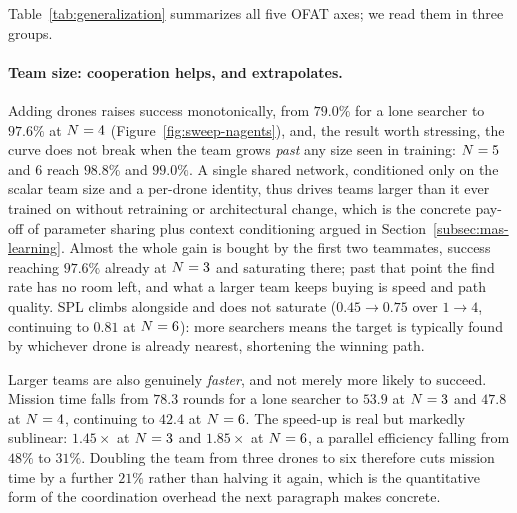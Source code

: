 Table~\ref{tab:generalization} summarizes all five OFAT axes; we read them in
three groups.

\paragraph{Team size: cooperation helps, and extrapolates.}
Adding drones raises success monotonically, from $79.0\%$ for a lone searcher to
$97.6\%$ at $N = 4$ (Figure~\ref{fig:sweep-nagents}), and, the result
worth stressing, the curve does not break when the team grows \emph{past} any
size seen in training: $N = 5$ and $6$ reach $98.8\%$ and $99.0\%$. A
single shared network, conditioned only on the scalar team size and a per-drone
identity, thus drives teams larger than it ever trained on without retraining or
architectural change, which is the concrete pay-off of parameter sharing plus
context conditioning argued in Section~\ref{subsec:mas-learning}. Almost the
whole gain is bought by the first two teammates, success reaching $97.6\%$
already at $N = 3$ and saturating there; past that point the find rate has
no room left, and what a larger team keeps buying is speed and path quality. SPL
climbs alongside and does not saturate ($0.45 \to 0.75$ over $1\!\to\!4$,
continuing to $0.81$ at $N = 6$): more searchers means the target is
typically found by whichever drone is already nearest, shortening the winning
path.

Larger teams are also genuinely \emph{faster}, and not merely more likely to
succeed. Mission time falls from $78.3$ rounds for a lone searcher to $53.9$ at
$N = 3$ and $47.8$ at $N = 4$, continuing to $42.4$ at
$N = 6$. The speed-up is real but markedly sublinear: $1.45\times$ at
$N = 3$ and $1.85\times$ at $N = 6$, a parallel efficiency falling
from $48\%$ to $31\%$. Doubling the team from three drones to six therefore cuts
mission time by a further $21\%$ rather than halving it again, which is the
quantitative form of the coordination overhead the next paragraph makes
concrete.

